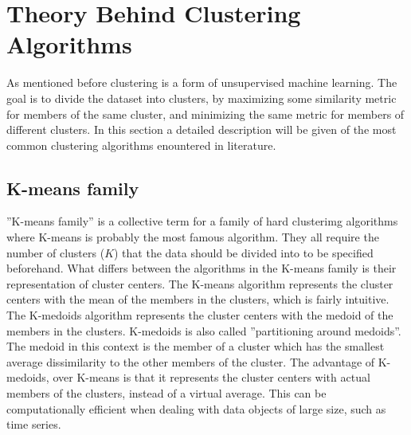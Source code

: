 
\section{Theory Behind Clustering Algorithms}
As mentioned before clustering is a form of unsupervised machine learning. 
The goal is to divide the dataset into clusters, by maximizing some similarity metric for members of the same cluster, 
and minimizing the same metric for members of different clusters.
In this section a detailed description will be given of the most common clustering algorithms enountered in literature.

\subsection{K-means family}
''K-means family'' is a collective term for a family of hard clusterimg algorithms where K-means is probably the most famous algorithm.
They all require the number of clusters ($K$) that the data should be divided into to be specified beforehand.
What differs between the algorithms in the K-means family is their representation of cluster centers.
The K-means algorithm represents the cluster centers with the mean of the members in the clusters, which is fairly intuitive.
The K-medoids algorithm represents the cluster centers with the medoid of the members in the clusters.
K-medoids is also called ''partitioning around medoids''.
The medoid in this context is the member of a cluster which has the smallest average dissimilarity to the other members of the cluster. 
The advantage of K-medoids, over K-means is that it represents the cluster centers with actual members of the clusters, instead of a virtual average. 
This can be computationally efficient when dealing with data objects of large size, such as time series. \bigskip

